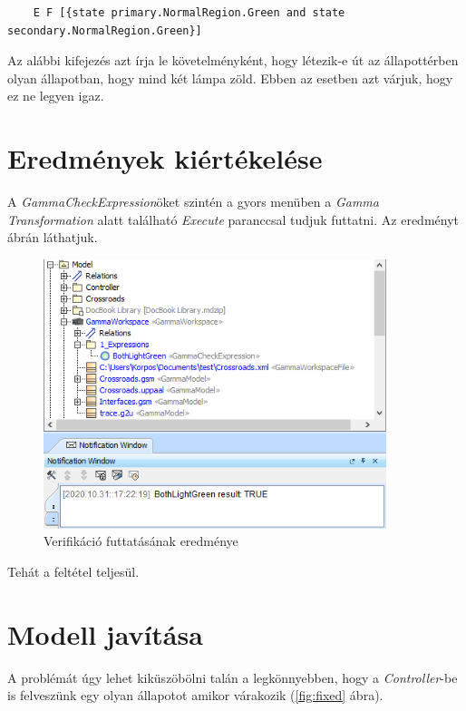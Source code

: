 \begin{lstlisting}	
	E F [{state primary.NormalRegion.Green and state secondary.NormalRegion.Green}]
\end{lstlisting}

Az alábbi kifejezés azt írja le követelményként, hogy létezik-e út az állapottérben olyan állapotban, hogy mind két lámpa zöld. Ebben az esetben azt várjuk, hogy ez ne legyen igaz.

\section{Eredmények kiértékelése}

A \emph{GammaCheckExpression}öket szintén a gyors menüben a  \emph{Gamma Transformation} alatt található \emph{Execute} paranccsal tudjuk futtatni. Az eredményt  ábrán láthatjuk.

\begin{figure}[!ht]
	\centering
	\includegraphics[width=10cm, keepaspectratio]{figures/contribution/verif1.png}
	\caption{Verifikáció futtatásának eredménye}
	\label{fig:verif1}
\end{figure}


Tehát a feltétel teljesül.


\section{Modell javítása}

A problémát úgy lehet kiküszöbölni talán a legkönnyebben, hogy a \emph{Controller}-be is felveszünk egy olyan állapotot amikor várakozik (\ref{fig:fixed} ábra).

